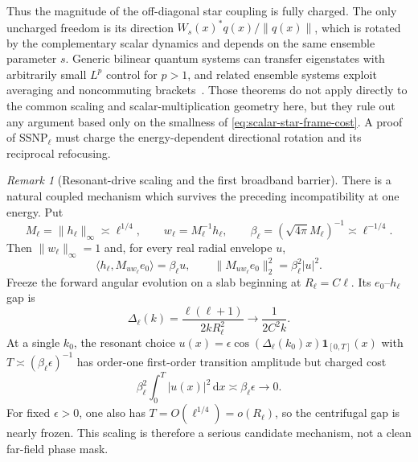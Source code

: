 \documentclass[11pt]{article}
\newcommand{\dd}{\,\mathrm d}
\theoremstyle{definition}
\theoremstyle{remark}
\newtheorem{remark}[theorem]{Remark}
\begin{document}
Thus the magnitude of the off-diagonal star coupling is fully charged.  The
only uncharged freedom is its direction
$W_s(x)^*q(x)/\|q(x)\|$, which is rotated by the complementary scalar dynamics
and depends on the same ensemble parameter $s$.  Generic bilinear quantum
systems can transfer eigenstates with arbitrarily small $L^p$ control for
$p>1$, and related ensemble systems exploit averaging and noncommuting
brackets~\cite{BoussaidCaponigroChambrion2012,Chambrion2013}.  Those theorems
do not apply directly to the common scaling and scalar-multiplication geometry
here, but they rule out any argument based only on the smallness of
\eqref{eq:scalar-star-frame-cost}.  A proof of $\mathrm{SSNP}_\ell$ must charge
the energy-dependent directional rotation and its reciprocal refocusing.

\begin{remark}[Resonant-drive scaling and the first broadband barrier]
There is a natural coupled mechanism which survives the preceding
incompatibility at one energy.  Put
\begin{equation}
 M_\ell=\|h_\ell\|_\infty\asymp\ell^{1/4},
 \qquad w_\ell=M_\ell^{-1}h_\ell,
 \qquad \beta_\ell=(\sqrt{4\pi}M_\ell)^{-1}\asymp\ell^{-1/4}.
 \label{eq:resonant-drive-beta}
\end{equation}
Then $\|w_\ell\|_\infty=1$ and, for every real radial envelope $u$,
\begin{equation}
 \langle h_\ell,M_{u w_\ell}e_0\rangle=\beta_\ell u,
 \qquad
 \|M_{u w_\ell}e_0\|_2^2=\beta_\ell^2|u|^2.
 \label{eq:resonant-drive-coupling-cost}
\end{equation}
Freeze the forward angular evolution on a slab beginning at
$R_\ell=C\ell$.  Its $e_0$--$h_\ell$ gap is
\begin{equation}
 \Delta_\ell(k)=\frac{\ell(\ell+1)}{2kR_\ell^2}
 \longrightarrow\frac1{2C^2k}.
 \label{eq:frozen-resonant-gap}
\end{equation}
At a single $k_0$, the resonant choice
$u(x)=\epsilon\cos(\Delta_\ell(k_0)x)\mathbf1_{[0,T]}(x)$ with
$T\asymp(\beta_\ell\epsilon)^{-1}$ has order-one first-order transition
amplitude but charged cost
\begin{equation}
 \beta_\ell^2\int_0^T|u(x)|^2\dd x
 \asymp\beta_\ell\epsilon\longrightarrow0.
 \label{eq:single-energy-resonant-cost}
\end{equation}
For fixed $\epsilon>0$, one also has $T=O(\ell^{1/4})=o(R_\ell)$, so the
centrifugal gap is nearly frozen.  This scaling is therefore a serious
candidate mechanism, not a clean far-field phase mask.


\end{remark}
\end{document}

